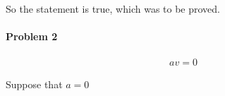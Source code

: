 So the statement is true, which was to be proved.

\paragraph{Problem 2}

\begin{align*}
	av = 0
\end{align*}

Suppose that $a=0$ 





































































